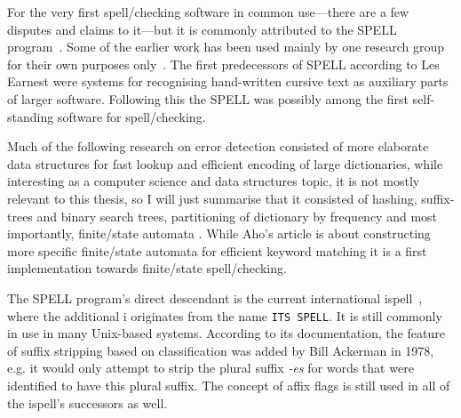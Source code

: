 \documentclass[officiallayout]{unihelcompling}
\begin{document}
For the very first spell\-/checking software in common use---there are a few
disputes and claims to it---but it is commonly attributed to the SPELL
program~\citep{gorin1971spell}.  Some of the earlier work has been used mainly
by one research group for their own purposes
only~\citep{earnest2011first,earnest2012first,earnest2013legacies}. The first
predecessors of SPELL according to Les Earnest were systems for recognising
hand-written cursive text as auxiliary parts of larger software. Following this
the SPELL was possibly among the first self-standing software for
spell\-/checking.


Much of the following research on error detection consisted of more elaborate
data structures for fast lookup and efficient encoding of large dictionaries,
while interesting as a computer science and data structures topic, it is not
mostly relevant to this thesis, so I will just summarise that it consisted of
hashing, suffix-trees and binary search trees, partitioning of dictionary by
frequency \citep{knuth1973art} and most importantly, finite\-/state automata
\citep{aho1975efficient}. While Aho's article is about constructing more
specific finite\-/state automata for efficient keyword matching it is a first
implementation towards finite\-/state spell\-/checking.

The SPELL program's direct descendant is the current international
ispell~\citep{gorin1971spell}, where the additional i originates from the name
\texttt{ITS SPELL}. It is still commonly in use in many Unix-based systems.
According to its documentation, the feature of suffix stripping based on
classification was added by Bill Ackerman in 1978, e.g. it would only attempt
to strip the plural suffix \emph{-es} for words that were identified to have
this plural suffix.  The concept of affix flags is still used in all of the
ispell's successors as well.
\end{document}

